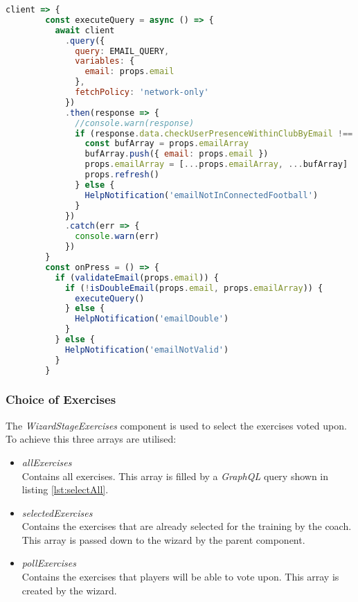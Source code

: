 \begin{lstlisting}[language=javascript, caption=Check in Connected.Football environment, label=lst:pollGuestGraphQLCheck]
client => {
        const executeQuery = async () => {
          await client
            .query({
              query: EMAIL_QUERY,
              variables: {
                email: props.email
              },
              fetchPolicy: 'network-only'
            })
            .then(response => { 
              //console.warn(response)
              if (response.data.checkUserPresenceWithinClubByEmail !== null) {
                const bufArray = props.emailArray
                bufArray.push({ email: props.email })
                props.emailArray = [...props.emailArray, ...bufArray]
                props.refresh()
              } else {
                HelpNotification('emailNotInConnectedFootball')
              }
            })
            .catch(err => {
              console.warn(err)
            })
        }
        const onPress = () => {
          if (validateEmail(props.email)) {
            if (!isDoubleEmail(props.email, props.emailArray)) {
              executeQuery()
            } else {
              HelpNotification('emailDouble')
            }
          } else {
            HelpNotification('emailNotValid')
          }
        }
\end{lstlisting}

\subsubsection{Choice of Exercises}
\label{sssec:poll_exercises}

The \textit{WizardStageExercises} component is used to select the exercises voted upon. To achieve this three arrays are utilised:

\begin{itemize}
    \item \textit{allExercises}\\
    Contains all exercises. This array is filled by a \textit{GraphQL} query shown in listing \ref{lst:selectAll}.
    \item \textit{selectedExercises}\\
    Contains the exercises that are already selected for the training by the coach. This array is passed down to the wizard by the parent component.
    \item \textit{pollExercises}\\
    Contains the exercises that players will be able to vote upon. This array is created by the wizard.
\end{itemize}

